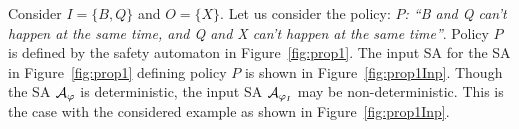%
\begin{example}
	\label{eg:prop}
	Consider $I= \{B,Q\}$ and $O = \{ X \}$.
	Let us consider the policy: \textit{$P$: ``B and Q can't happen at the same time, and Q and X can't happen at the same time''}.
	Policy $P$ is defined by the safety automaton in Figure~\ref{fig:prop1}.
	The input SA for the SA in Figure~\ref{fig:prop1} defining policy $P$ is shown in Figure~\ref{fig:prop1Inp}.
	Though the SA ${\cal A}_\varphi$ is deterministic, the input SA ${\cal A}_{\varphi_I}$ may be non-deterministic. This is the case with the considered example as shown in Figure~\ref{fig:prop1Inp}.
\end{example} 


